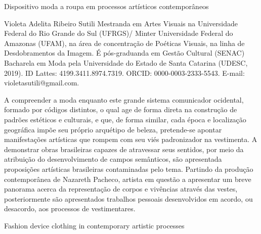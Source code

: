 \begin{refsection}
    \renewcommand{\thefigure}{\arabic{figure}}

    \chapterTwoLines
    {Dispositivo moda}
    {a roupa em processos artísticos contemporâneos}
    \label{chap:dispositivo}
    
    \articleAuthor
    {Violeta Adelita Ribeiro Sutili}
    {Mestranda em Artes Visuais na Universidade Federal do Rio Grande do Sul (UFRGS)/ Minter Universidade Federal do Amazonas (UFAM), na área de concentração de Poéticas Visuais, na linha de Desdobramentos da Imagem. É pós-graduanda em Gestão Cultural (SENAC) Bacharela em Moda pela Universidade do Estado de Santa Catarina (UDESC, 2019). ID Lattes: 4199.3411.8974.7319. ORCID: 0000-0003-2333-5543. E-mail: violetasutili@gmail.com.}

    \begin{galoResumo}
        A compreender a moda enquanto este grande sistema comunicador ocidental, formado por códigos distintos, o qual age de forma direta na construção de padrões estéticos e culturais, e que, de forma similar, cada época e localização geográfica impõe seu próprio arquétipo de beleza, pretende-se apontar manifestações artísticas que rompem com seu viés padronizador na vestimenta. A demonstrar obras brasileiras capazes de atravessar seus sentidos, por meio da atribuição do desenvolvimento de campos semânticos, são apresentada proposições artísticas brasileiras contaminadas pelo tema. Partindo da produção contemporânea de Nazareth Pacheco, artista em questão a apresentar um breve panorama acerca da representação de corpos e vivências através das vestes, posteriormente são apresentados trabalhos pessoais desenvolvidos em acordo, ou desacordo, aos processos de vestimentares.
    \end{galoResumo}
    
    
    \begin{otherlanguage}{english}
    
    \fakeChapterTwoLines
    {Fashion device}
    {clothing in contemporary artistic processes}


\end{otherlanguage}
\end{refsection}
